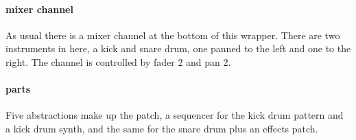 \paragraph{mixer channel}
As usual there is a mixer channel at the bottom of this wrapper. There are
two instruments in here, a kick and snare drum, one panned to the left
and one to the right. The channel is controlled by fader 2 and pan 2.

\paragraph{parts}

Five abstractions make up the patch, a sequencer for the kick drum pattern
and a kick drum synth, and the same for the snare drum plus an effects
patch.
